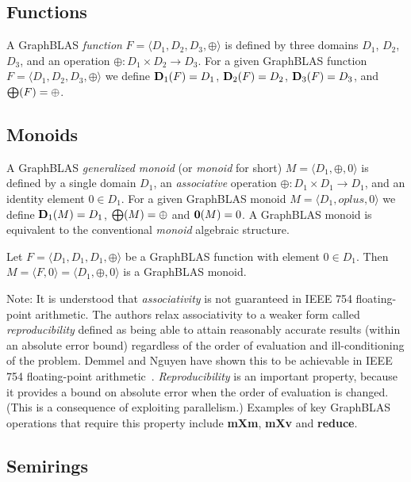 \documentclass[11pt]{extarticle}
\begin{document}
\subsection{Functions}

A GraphBLAS \emph{function} $F = \langle D_1,D_2,D_3,\oplus \rangle$
is defined by three domains $D_1$, $D_2$, $D_3$, and an operation
$\oplus: D_1 \times D_2 \rightarrow D_3$.  For a given GraphBLAS function
$F=\langle D_1, D_2, D_3,\oplus \rangle$ we define $\bold{D}_1(F) = D_1$,
$\bold{D}_2(F) = D_2$, $\bold{D}_3(F) = D_3$, and $\bold{\bigoplus}(F)
= \oplus$.

\subsection{Monoids}

A GraphBLAS \emph{generalized monoid} (or \emph{monoid} for short) $M =
\langle D_1,\oplus,0 \rangle$ is defined by a single domain $D_1$, an 
\emph{associative} operation $\oplus: D_1 \times D_1 \rightarrow D_1$,
and an identity element $0 \in D_1$.  For a given GraphBLAS monoid $M=\langle
D_1,oplus,0 \rangle$ we define $\bold{D}_1(M) = D_1$, $\bold{\bigoplus}(M) =
\oplus$ and $\bold{0}(M) = 0$.  A GraphBLAS monoid is equivalent to 
the conventional \emph{monoid} algebraic structure.

Let $F = \langle D_1,D_1,D_1,\oplus \rangle$ be a GraphBLAS function
with element $0 \in D_1$.  Then $M = \langle F,0 \rangle = \langle
D_1,\oplus,0 \rangle$ is a GraphBLAS monoid.

Note: It is understood that \emph{associativity} is not guaranteed in IEEE 754 floating-point arithmetic. The authors relax associativity to a weaker form called \emph{reproducibility} defined as being able to attain reasonably accurate results (within an absolute error bound) regardless of the order of evaluation and ill-conditioning of the problem. Demmel and Nguyen have shown this to be achievable in IEEE 754 floating-point arithmetic~\cite{Demmel:2013:FRF}. \emph{Reproducibility} is an important property, because it provides a bound on absolute error when the order of evaluation is changed. (This is a consequence of exploiting parallelism.) Examples of key GraphBLAS operations that require this property include {\mbox{\bf mXm}}, {\mbox{\bf mXv}} and {\mbox{\bf reduce}}.

\subsection{Semirings}
\end{document}
